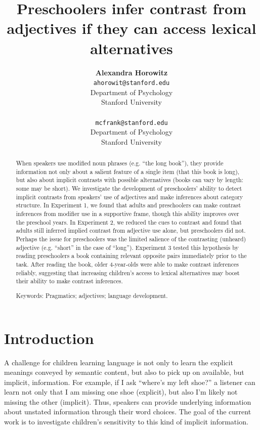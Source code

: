 \documentclass[10pt,letterpaper]{article}
\title{Preschoolers infer contrast from adjectives if they can access lexical alternatives}
\author{{\large \bf Alexandra Horowitz} \\ \texttt{ahorowit@stanford.edu}\\ Department of Psychology \\ Stanford University \\ 
\And {\large \bf Michael C. Frank} \\ \texttt{mcfrank@stanford.edu} \\ Department of Psychology \\ Stanford University \\ }
\begin{document}
\maketitle

\begin{abstract} 

When speakers use modified noun phrases (e.g. ``the long book''), they provide information not only about a salient feature of a single item (that this book is long), but also about implicit contrasts with possible alternatives (books can vary by length: some may be short).  We investigate the development of preschoolers' ability to detect implicit contrasts from speakers' use of adjectives and make inferences about category structure.  In Experiment 1, we found that adults and preschoolers can make contrast inferences from modifier use in a supportive frame, though this ability improves over the preschool years.  In Experiment 2, we reduced the cues to contrast and found that adults still inferred implied contrast from adjective use alone, but preschoolers did not.  Perhaps the issue for preschoolers was the limited salience of the contrasting (unheard) adjective (e.g. ``short'' in the case of ``long''). Experiment 3 tested this hypothesis by reading preschoolers a book containing relevant opposite pairs immediately prior to the task.  After reading the book, older 4-year-olds were able to make contrast inferences reliably, suggesting that increasing children's access to lexical alternatives may boost their ability to make contrast inferences.

{Keywords:} Pragmatics; adjectives; language development. 
\end{abstract}

\section{Introduction}

A challenge for children learning language is not only to learn the explicit meanings conveyed by semantic content, but also to pick up on available, but implicit, information.  For example, if I ask ``where's my left shoe?'' a listener can learn not only that I am missing one shoe (explicit), but also I'm likely not missing the other (implicit).  Thus, speakers can provide underlying information about unstated information through their word choices.  The goal of the current work is to investigate children's sensitivity to this kind of implicit information. 
\end{document}
